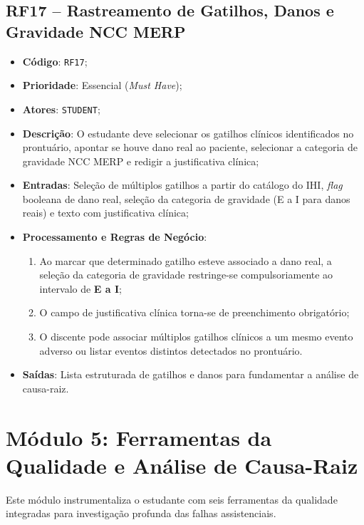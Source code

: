 \subsection{RF17 -- Rastreamento de Gatilhos, Danos e Gravidade NCC MERP}
\begin{itemize}
    \item \textbf{Código}: \texttt{RF17};
    \item \textbf{Prioridade}: Essencial (\textit{Must Have});
    \item \textbf{Atores}: \texttt{STUDENT};
    \item \textbf{Descrição}: O estudante deve selecionar os gatilhos clínicos identificados no prontuário, apontar se houve dano real ao paciente, selecionar a categoria de gravidade NCC MERP e redigir a justificativa clínica;
    \item \textbf{Entradas}: Seleção de múltiplos gatilhos a partir do catálogo do IHI, \textit{flag} booleana de dano real, seleção da categoria de gravidade (E a I para danos reais) e texto com justificativa clínica;
    \item \textbf{Processamento e Regras de Negócio}:
    \begin{enumerate}
        \item Ao marcar que determinado gatilho esteve associado a dano real, a seleção da categoria de gravidade restringe-se compulsoriamente ao intervalo de \textbf{E a I};
        \item O campo de justificativa clínica torna-se de preenchimento obrigatório;
        \item O discente pode associar múltiplos gatilhos clínicos a um mesmo evento adverso ou listar eventos distintos detectados no prontuário.
    \end{enumerate}
    \item \textbf{Saídas}: Lista estruturada de gatilhos e danos para fundamentar a análise de causa-raiz.
\end{itemize}

\section{Módulo 5: Ferramentas da Qualidade e Análise de Causa-Raiz}
\label{sec_mod5_qualidade}

Este módulo instrumentaliza o estudante com seis ferramentas da qualidade integradas para investigação profunda das falhas assistenciais.

